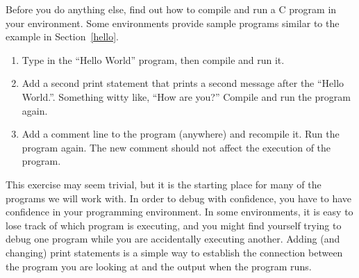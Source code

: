 \begin{exercise}

Before you do anything else, find out how to compile and run a C
program in your environment.  Some environments provide sample programs
similar to the example in Section~\ref{hello}.

\begin{enumerate}

\item Type in the ``Hello World'' program, then compile and run it.

\item Add a second print statement that prints a second message after
the ``Hello World.''.  Something witty like, ``How are you?''
Compile and run the program again.

\item Add a comment line to the program (anywhere) and recompile
it.  Run the program again.  The new comment should not affect the
execution of the program.

\end{enumerate}

This exercise may seem trivial, but it is the starting place for many
of the programs we will work with.  In order to debug with confidence,
you have to have confidence in your programming environment.  In some
environments, it is easy to lose track of which program is executing,
and you might find yourself trying to debug one program while you are
accidentally executing another.  Adding (and changing) print statements
is a simple way to establish the connection between the program you
are looking at and the output when the program runs.

\end{exercise}


